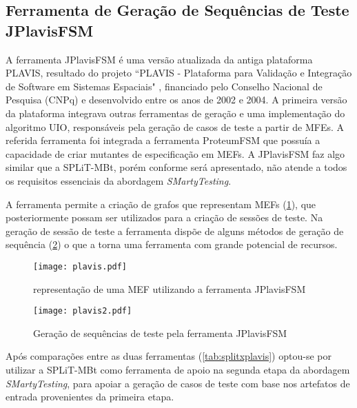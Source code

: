 \subsection{Ferramenta de Geração de Sequências de Teste JPlavisFSM}
\label{cap2subsec:plavis}

A ferramenta JPlavisFSM \cite{pinheiro2012jplavisfsm} é uma versão atualizada da antiga plataforma PLAVIS, resultado do projeto ``PLAVIS - Plataforma para Validação e Integração de Software em Sistemas Espaciais" \cite{da2008plavis}, financiado pelo Conselho Nacional de Pesquisa (CNPq) e desenvolvido entre os anos de 2002 e 2004. A primeira versão da plataforma integrava outras ferramentas de geração e uma implementação do algoritmo UIO, responsáveis pela geração de casos de teste a partir de MFEs. A referida ferramenta foi integrada a ferramenta ProteumFSM que possuía a capacidade de criar mutantes de especificação em MEFs. A JPlavisFSM faz algo similar que a SPLiT-MBt, porém conforme será apresentado, não atende a todos os requisitos essenciais da abordagem \textit{SMartyTesting}.

A ferramenta permite a criação de grafos que representam MEFs (\ref{fig:plavis}), que posteriormente possam ser utilizados para a criação de sessões de teste. Na geração de sessão de teste a ferramenta dispõe de alguns métodos de geração de sequência (\ref{fig:plavis2}) o que a torna uma ferramenta com grande potencial de recursos.

\begin{figure}[h!]
	\centering
	\texttt{[image: plavis.pdf]}
	\caption{representação de uma MEF utilizando a ferramenta JPlavisFSM \cite{pinheiro2012jplavisfsm}}
	\label{fig:plavis}
\end{figure}

\begin{figure}[h!]
	\centering
	\texttt{[image: plavis2.pdf]}
	\caption{Geração de sequências de teste pela ferramenta JPlavisFSM \cite{pinheiro2012jplavisfsm}}
	\label{fig:plavis2}
\end{figure}

Após comparações entre as duas ferramentas (\ref{tab:splitxplavis}) optou-se por utilizar a SPLiT-MBt como ferramenta de apoio na segunda etapa da abordagem \textit{SMartyTesting}, para apoiar a geração de casos de teste com base nos artefatos de entrada provenientes da primeira etapa. 

